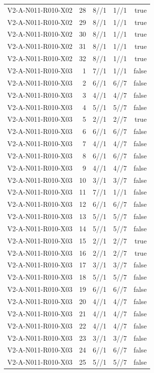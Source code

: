 {\begin{longtable}{lrrrr}
V2-A-N011-R010-X02 & 28 & 8//1 & 1//1 & true \\
V2-A-N011-R010-X02 & 29 & 8//1 & 1//1 & true \\
V2-A-N011-R010-X02 & 30 & 8//1 & 1//1 & true \\
V2-A-N011-R010-X02 & 31 & 8//1 & 1//1 & true \\
V2-A-N011-R010-X02 & 32 & 8//1 & 1//1 & true \\
V2-A-N011-R010-X03 & 1 & 7//1 & 1//1 & false \\
V2-A-N011-R010-X03 & 2 & 6//1 & 6//7 & false \\
V2-A-N011-R010-X03 & 3 & 4//1 & 4//7 & false \\
V2-A-N011-R010-X03 & 4 & 5//1 & 5//7 & false \\
V2-A-N011-R010-X03 & 5 & 2//1 & 2//7 & true \\
V2-A-N011-R010-X03 & 6 & 6//1 & 6//7 & false \\
V2-A-N011-R010-X03 & 7 & 4//1 & 4//7 & false \\
V2-A-N011-R010-X03 & 8 & 6//1 & 6//7 & false \\
V2-A-N011-R010-X03 & 9 & 4//1 & 4//7 & false \\
V2-A-N011-R010-X03 & 10 & 3//1 & 3//7 & false \\
V2-A-N011-R010-X03 & 11 & 7//1 & 1//1 & false \\
V2-A-N011-R010-X03 & 12 & 6//1 & 6//7 & false \\
V2-A-N011-R010-X03 & 13 & 5//1 & 5//7 & false \\
V2-A-N011-R010-X03 & 14 & 5//1 & 5//7 & false \\
V2-A-N011-R010-X03 & 15 & 2//1 & 2//7 & true \\
V2-A-N011-R010-X03 & 16 & 2//1 & 2//7 & true \\
V2-A-N011-R010-X03 & 17 & 3//1 & 3//7 & false \\
V2-A-N011-R010-X03 & 18 & 5//1 & 5//7 & false \\
V2-A-N011-R010-X03 & 19 & 6//1 & 6//7 & false \\
V2-A-N011-R010-X03 & 20 & 4//1 & 4//7 & false \\
V2-A-N011-R010-X03 & 21 & 4//1 & 4//7 & false \\
V2-A-N011-R010-X03 & 22 & 4//1 & 4//7 & false \\
V2-A-N011-R010-X03 & 23 & 3//1 & 3//7 & false \\
V2-A-N011-R010-X03 & 24 & 6//1 & 6//7 & false \\
V2-A-N011-R010-X03 & 25 & 5//1 & 5//7 & false \\

\end{longtable}}
